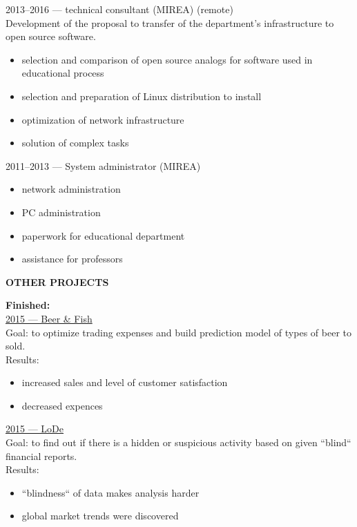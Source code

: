\documentclass[a4paper,12pt,fullpage]{article}
\begin{document}
2013--2016 --- technical consultant (MIREA) (remote)\\
Development of the proposal to transfer of the department's infrastructure to open source software.
\begin{itemize}
	\item selection and comparison of open source analogs for software used in educational process
	\item selection and preparation of Linux distribution to install
	\item optimization of network infrastructure
	\item solution of complex tasks\\
\end{itemize}

2011--2013 --- System administrator (MIREA)
\begin{itemize}
	\item network administration
	\item PC administration
	\item paperwork for educational department
	\item assistance for professors
\end{itemize}

\begin{center}
	\textbf{OTHER PROJECTS}
\end{center}

\textbf{Finished:}\\
\underline{2015 --- Beer \& Fish}\\
Goal: to optimize trading expenses and build prediction model of types of beer to sold.\\
Results:
\begin{itemize}
	\item increased sales and level of customer satisfaction
	\item decreased expences\\
\end{itemize}

\underline{2015 --- LoDe}\\
Goal: to find out if there is a hidden or suspicious activity  based on given ``blind`` financial reports.\\
Results:
\begin{itemize}
	\item ``blindness`` of data makes analysis harder
	\item global market trends were discovered\\
\end{itemize}
\end{document}
